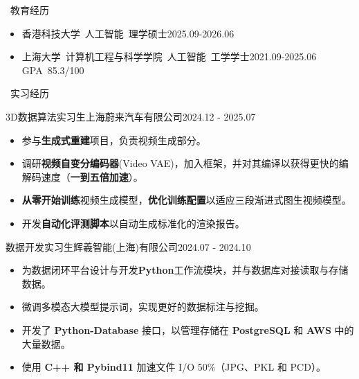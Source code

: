 \documentclass[UTF8]{resume}
\begin{document}
\begin{rSection}{\faGraduationCap~教育经历}
    \begin{itemize}
        \item 香港科技大学~人工智能~理学硕士\hfill 2025.09-2026.06
        \item 上海大学~计算机工程与科学学院~人工智能~工学学士\hfill 2021.09-2025.06 \\ GPA~85.3/100
    \end{itemize}
\end{rSection}
 
\begin{rSection}{\faBriefcase~实习经历}
    \begin{rExperience}{3D数据算法实习生}{上海蔚来汽车有限公司}{2024.12 - 2025.07}
        \begin{itemize}
            \itemsep -0.5em \vspace{-0.5em}
            \item 参与\textbf{生成式重建}项目，负责视频生成部分。
            \item 调研\textbf{视频自变分编码器}(Video VAE)，加入框架，并对其编译以获得更快的编解码速度（\textbf{一到五倍加速}）。
            \item \textbf{从零开始训练}视频生成模型，\textbf{优化训练配置}以适应三段渐进式图生视频模型。
            \item 开发\textbf{自动化评测脚本}以自动生成标准化的渲染报告。
        \end{itemize}
    \end{rExperience}

    \begin{rExperience}{数据开发实习生}{辉羲智能(上海)有限公司}{2024.07 - 2024.10}
        \begin{itemize}
            \itemsep -0.5em \vspace{-0.5em}
            \item 为数据闭环平台设计与开发\textbf{Python}工作流模块，并与数据库对接读取与存储数据。
            \item 微调多模态大模型提示词，实现更好的数据标注与挖掘。
            \item 开发了 \textbf{Python-Database} 接口，以管理存储在 \textbf{PostgreSQL} 和 \textbf{AWS} 中的大量数据。
            \item 使用 \textbf{C++ 和 Pybind11} 加速文件 I/O 50\%（JPG、PKL 和 PCD）。
        \end{itemize}
    \end{rExperience}


\end{rSection}
\end{document}
